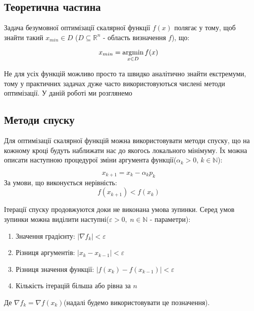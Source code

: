 \begin{center}
    \section*{Теоретична частина}
\end{center}

Задача безумовної оптимізації скалярної функції $f(x)$
полягає у тому, щоб знайти такий $x_{min} \in D$
($ D \subseteq \mathbb{R}^n $ - область визначення $f$), що:

\begin{equation} \label{eq:optimization_task}
    x_{min} = \mathop{\mathrm{argmin}}\limits_{x \in D} f(x)
\end{equation}

Не для усіх функцій можливо просто та швидко
аналітично знайти екстремуми, тому у практичних
задачах дуже часто використовуються числені методи
оптимізації. У даній роботі ми розглянемо

\subsection*{Методи спуску}

Для оптимізації скалярної функцій можна
використовувати методи спуску, що на кожному кроці
будуть наближати нас до якогось локального мінімуму.
Їх можна описати наступною процедурої зміни
аргумента функції($\alpha_k > 0$, $k \in \mathbb{N}$):

\begin{equation} \label{eq:descent}
    x_{k+1} = x_{k} - \alpha_k p_{k}
\end{equation}
За умови, що виконується нерівність:
\begin{equation} \label{eq:descent_require}
    f(x_{k+1}) < f(x_k)
\end{equation}

Ітерації спуску продовжуются доки не виконана умова зупинки.
Серед умов зупинки можна виділити наступні($\varepsilon > 0,\;
n \in \mathbb{N}$ - параметри):

\begin{enumerate}
    \item Значення градієнту: $|\nabla f_k| < \varepsilon$
    \item Різниця аргументів: $|x_k - x_{k-1}| < \varepsilon$
    \item Різниця значення функції: $|f(x_k) - f(x_{k-1})| < \varepsilon$
    \item Кількість ітерацій більша або рівна за $n$
\end{enumerate}
Де $ \nabla f_{k} = \nabla f(x_{k})$(надалі будемо
використовувати це позначення).


